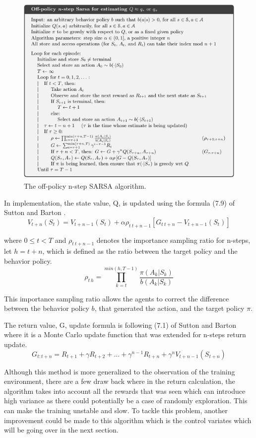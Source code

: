 \documentclass{article}
\begin{document}
\begin{figure}[!ht]
	\centering
	\includegraphics[scale=0.54]{./images/Figure 6.png}
	\caption{The off-policy n-step SARSA algorithm.}
	\label{fig:Figure6}
\end{figure}

In implementation, the state value, Q, is updated using the formula (7.9) of Sutton and Barton
\citep{sutton_barton}.
\[
	V_{t+n}(S_t) = V_{t+n-1}(S_t)+\alpha\rho_{t\:t+n-1}[G_{t\:t+n} -
		V_{t+n-1}(S_t)]
\]

where $0 \leq t < T$ and $\rho_{t\:t+n-1}$ denotes the importance sampling ratio
for n-steps, let $h = t + n$, which is defined as the ratio between the target policy and the behavior
policy\citep{sutton_barton}.
\[
	\rho_{t\:h} = \prod_{k=t}^{min(h, T-1)}\frac{\pi(A_k|S_k)}{b(A_k|S_k)}
\]

This importance sampling ratio allows the agents to correct the difference
between the behavior policy $b$, that generated the action, and the target policy
$\pi$.

The return value, G, update formula is following (7.1) of Sutton and Barton
\citep{sutton_barton} where it is a Monte Carlo update function that was
extended for n-steps return update\citep{sutton_barton}.
\[
	G_{t:t+n}=R_{t+1}+\gamma R_{t+2} + \dots +
	\gamma^{n-1}R_{t+n}+\gamma^nV_{t+n-1}(S_{t+n})
\]

Although this method is more generalized to the observation of the training
environment, there are a few draw back where in the return calculation, the
algorithm takes into account all the rewards that was seen which can introduce
high variance as there could potentially be a case of randomly exploration. This
can make the training unstable and slow. To tackle this problem, another
improvement could be made to this algorithm which is the control variates which
will be going over in the next section.
\end{document}
